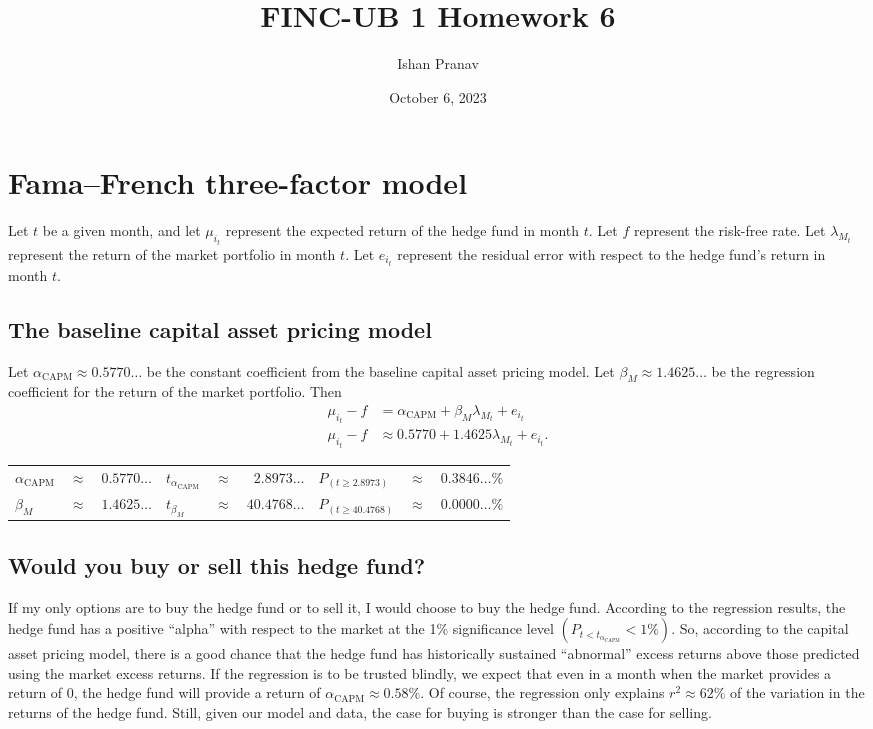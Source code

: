\documentclass[12pt]{article}
\title{FINC-UB 1 Homework 6}
\author{Ishan Pranav}
\date{October 6, 2023}
\begin{document}
\maketitle
\section*{Fama--French three-factor model}
Let $t$ be a given month, and let $\mu_{i_t}$ represent the expected return of the hedge fund in month $t$. Let $f$ represent the risk-free rate. Let $\lambda_{M_t}$ represent the return of the market portfolio in month $t$. Let $e_{i_t}$ represent the residual error with respect to the hedge fund's return in month $t$. 
\subsection{The baseline capital asset pricing model}
Let $\alpha_{\mathrm{CAPM}}\approx 0.5770\dots$ be the constant coefficient from the baseline capital asset pricing model. Let $\beta_M\approx 1.4625\dots$ be the regression coefficient for the return of the market portfolio. Then
\begin{align*}
\mu_{i_t}-f&=\alpha_{\mathrm{CAPM}}+\beta_M\lambda_{M_t}+e_{i_t}\\
\mu_{i_t}-f&\approx 0.5770+1.4625\lambda_{M_t}+e_{i_t}.
\end{align*}
\begin{center}
\begin{tabular}{lcr|lcr|lcr}
$\alpha_{\mathrm{CAPM}}$&$\approx$&$0.5770\dots$&$t_{\alpha_{\mathrm{CAPM}}}$&$\approx$&$2.8973\dots$&$P_{(t\geq 2.8973)}$&$\approx$&$0.3846\dots\%$\\
$\beta_M$&$\approx$&$1.4625\dots$&$t_{\beta_M}$&$\approx$&$40.4768\dots$&$P_{(t\geq 40.4768)}$&$\approx$&$0.0000\dots\%$
\end{tabular}
\end{center}
\subsection{Would you buy or sell this hedge fund?}
If my only options are to buy the hedge fund or to sell it, I would choose to buy the hedge fund. According to the regression results, the hedge fund has a positive ``alpha'' with respect to the market at the 1\% significance level $\left(P_{t<t_{\alpha_{\mathrm{CAPM}}}}<1\%\right)$. So, according to the capital asset pricing model, there is a good chance that the hedge fund has historically sustained ``abnormal'' excess returns above those predicted using the market excess returns. If the regression is to be trusted blindly, we expect that even in a month when the market provides a return of 0, the hedge fund will provide a return of $\alpha_{\mathrm{CAPM}}\approx 0.58\%$. Of course, the regression only explains $r^2\approx 62\%$ of the variation in the returns of the hedge fund. Still, given our model and data, the case for buying is stronger than the case for selling.
\end{document}
